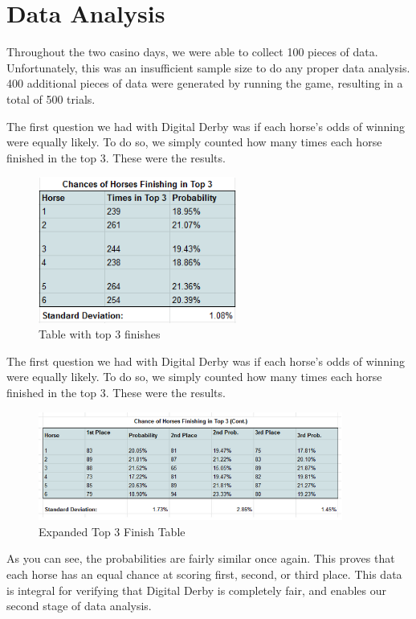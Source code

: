 \documentclass{article}
\begin{document}
\section{Data Analysis}
{
Throughout the two casino days, we were able to collect 100 pieces of data. Unfortunately, this was an insufficient sample size to do any proper data analysis. 400 additional pieces of data were generated by running the game, resulting in a total of 500 trials.

\vspace{2ex}

The first question we had with Digital Derby was if each horse’s odds of winning were equally likely. To do so, we simply counted how many times each horse finished in the top 3. These were the results. 


\begin{figure}[h]
\centering
\includegraphics[width=6.5cm]{images/chancetop3.png}
\caption{Table with top 3 finishes}
\end{figure}

\vspace{2ex}

The first question we had with Digital Derby was if each horse’s odds of winning were equally likely. To do so, we simply counted how many times each horse finished in the top 3. These were the results. 

\begin{figure}[h]
\centering
\includegraphics[width=10cm]{images/chancetop3expanded.png}
\caption{Expanded Top 3 Finish Table}
\end{figure}

As you can see, the probabilities are fairly similar once again. This proves that each horse has an equal chance at scoring first, second, or third place. This data is integral for verifying that Digital Derby is completely fair, and enables our second stage of data analysis.

}
\end{document}
